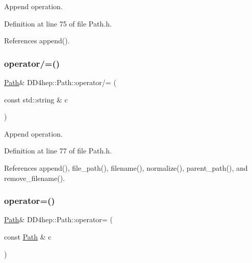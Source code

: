 Append operation. 



Definition at line 75 of file Path.\+h.



References append().

\hypertarget{class_d_d4hep_1_1_path_a523dd8b394e298b16ec54d602b85a87d}{}\label{class_d_d4hep_1_1_path_a523dd8b394e298b16ec54d602b85a87d} 
\subsubsection{\texorpdfstring{operator/=()}{operator/=()}\hspace{0.1cm}{\footnotesize\ttfamily [2/2]}}
{\footnotesize\ttfamily \hyperlink{class_d_d4hep_1_1_path}{Path}\& D\+D4hep\+::\+Path\+::operator/= (\begin{DoxyParamCaption}\item[{const std\+::string \&}]{c }\end{DoxyParamCaption})\hspace{0.3cm}{\ttfamily [inline]}}



Append operation. 



Definition at line 77 of file Path.\+h.



References append(), file\+\_\+path(), filename(), normalize(), parent\+\_\+path(), and remove\+\_\+filename().

\hypertarget{class_d_d4hep_1_1_path_a9d22ed81a818b6d7e982af1c4ea01dc4}{}\label{class_d_d4hep_1_1_path_a9d22ed81a818b6d7e982af1c4ea01dc4} 
\subsubsection{\texorpdfstring{operator=()}{operator=()}\hspace{0.1cm}{\footnotesize\ttfamily [1/2]}}
{\footnotesize\ttfamily \hyperlink{class_d_d4hep_1_1_path}{Path}\& D\+D4hep\+::\+Path\+::operator= (\begin{DoxyParamCaption}\item[{const \hyperlink{class_d_d4hep_1_1_path}{Path} \&}]{c }\end{DoxyParamCaption})\hspace{0.3cm}{\ttfamily [inline]}}



